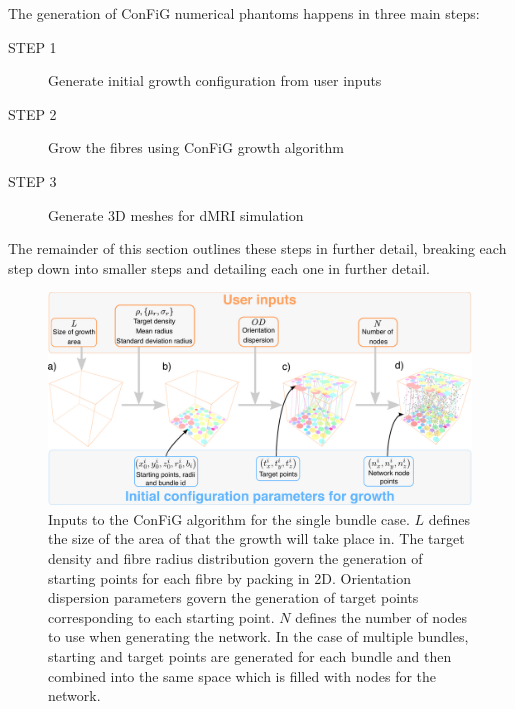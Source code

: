 The generation of ConFiG numerical phantoms happens in three main steps:
\begin{description}
  \item [STEP 1] \label{item:step1} Generate initial growth configuration from user inputs
  \item [STEP 2] Grow the fibres using ConFiG growth algorithm
  \item [STEP 3] Generate 3D meshes for dMRI simulation
\end{description}

The remainder of this section outlines these steps in further detail, breaking each step down into smaller steps and detailing each one in further detail. 

\begin{figure}[t]
  \centering
  \includegraphics[width=\textwidth]{figures/config/method_inputs_only.eps}
  \caption[Inputs to the ConFiG algorithm]{Inputs to the ConFiG algorithm for the single bundle case. $L$ defines the size of the area of that the growth will take place in. The target density and fibre radius distribution govern the generation of starting points for each fibre by packing in 2D. Orientation dispersion parameters govern the generation of target points corresponding to each starting point. $N$ defines the number of nodes to use when generating the network. In the case of multiple bundles, starting and target points are generated for each bundle and then combined into the same space which is filled with nodes for the network. }
  \label{fig:ipmi_inputs}
\end{figure}


